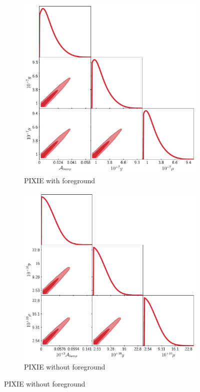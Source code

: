 \begin{figure}
    \centering
    \begin{subfigure}{0.49\textwidth}
        \centering
        \includegraphics[width=1\textwidth]{Constraints/Lognormal.pdf}
        \caption{PIXIE with foreground}
        \label{fig:LN}        
    \end{subfigure}
    \hfill
    \begin{subfigure}{0.49\textwidth}
        \centering
        \includegraphics[width=1\textwidth]{Constraints/LN_NN.pdf}
        \caption{PIXIE without foreground}
        \label{fig:LN_NN}        
    \end{subfigure}


\end{figure}
